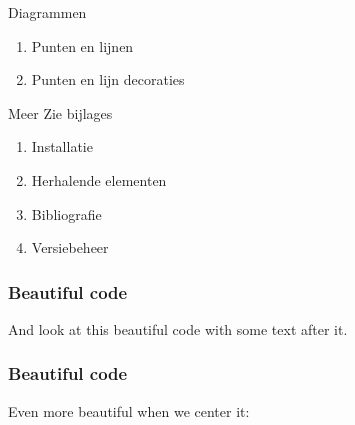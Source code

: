 \documentclass[handout]{beamer}
\begin{document}
\begin{frame}{Diagrammen}
	\begin{enumerate}
		\item Punten en lijnen
		\item Punten en lijn decoraties
	\end{enumerate}
\end{frame}

\begin{frame}{Meer}
	Zie bijlages
	\begin{enumerate}
		\item Installatie
		\item Herhalende elementen
		\item Bibliografie
		\item Versiebeheer
	\end{enumerate}
\end{frame}

%			
%			

\begin{frame}
	\frametitle{Beautiful code}
	And look at this beautiful code
	with some text after it.
	
\end{frame}

\begin{frame}
	\frametitle{Beautiful code}
	Even more beautiful when we center it:
	\begin{center}
	\end{center}
\end{frame}
\end{document}
